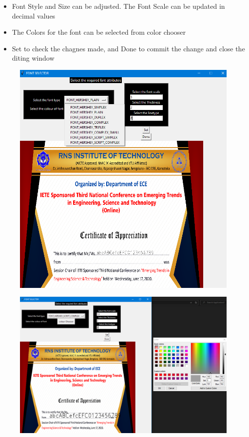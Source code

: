 \newpage
\begin{itemize}
	\item Font Style and Size can be adjusted. The Font Scale can be updated in decimal values
	\item The Colors for the font can be selected from color chooser
	\item Set to check the chagnes made, and Done to commit the change and close the diting window
\end{itemize}

\begin{figure}[H]
	\centering
	\includegraphics[width=0.7\linewidth]{"images/generation_qr_nqr/Screenshot (43)"}
	\label{fig:screenshot-43}
\end{figure}

\begin{figure}[H]
	\centering
	\includegraphics[width=0.7\linewidth]{"images/generation_qr_nqr/Screenshot (44)"}
	\label{fig:screenshot-44}
\end{figure}

